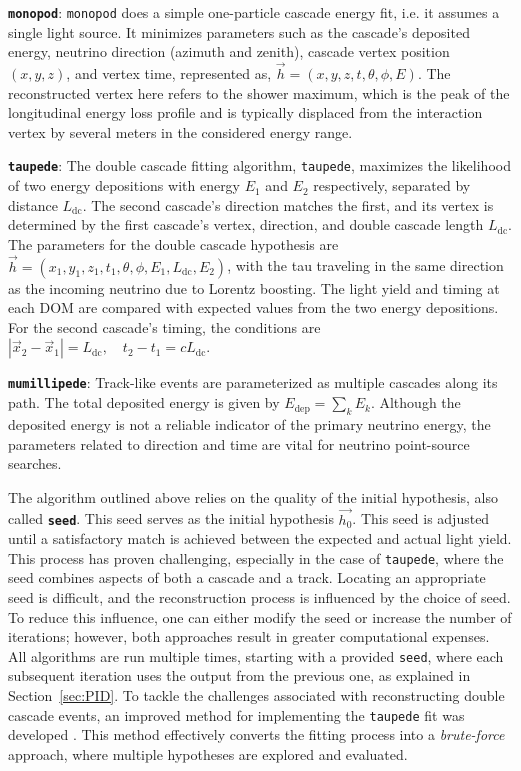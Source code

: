 \textbf{\texttt{monopod}}: \texttt{monopod} does a simple one-particle cascade energy fit, i.e. it assumes a single light source. It minimizes parameters such as the cascade's deposited energy, neutrino direction (azimuth and zenith), cascade vertex position $(x, y, z)$, and vertex time, represented as, $\vec{h} = (x, y, z, t, \theta, \phi, E)$. The reconstructed vertex here refers to the shower maximum, which is the peak of the longitudinal energy loss profile and is typically displaced from the interaction vertex by several meters in the considered energy range.

\textbf{\texttt{taupede}}: The double cascade fitting algorithm, \texttt{taupede}, maximizes the likelihood of two energy depositions with energy $E_1$ and $E_2$ respectively, separated by distance $L_{\mathrm{dc}}$. The second cascade's direction matches the first, and its vertex is determined by the first cascade's vertex, direction, and double cascade length $L_{\mathrm{dc}}$. The parameters for the double cascade hypothesis are $\vec{h} = (x_1, y_1, z_1, t_1, \theta, \phi, E_1, L_{\mathrm{dc}}, E_2)$, with the tau traveling in the same direction as the incoming neutrino due to Lorentz boosting. The light yield and timing at each DOM are compared with expected values from the two energy depositions. For the second cascade's timing, the conditions are $|\vec{x}_2 - \vec{x}_1| = L_{\text{dc}}, \quad t_2 - t_1 = c L_{\text{dc}}$. 

\textbf{\texttt{mumillipede}}: Track-like events are parameterized as multiple cascades along its path. The total deposited energy is given by $E_{\text{dep}} = \sum_k E_k$. Although the deposited energy is not a reliable indicator of the primary neutrino energy, the parameters related to direction and time are vital for neutrino point-source searches.

The algorithm outlined above relies on the quality of the initial hypothesis, also called \textbf{\texttt{seed}}. This seed serves as the initial hypothesis $\vec{h_0}$. This seed is adjusted until a satisfactory match is achieved between the expected and actual light yield. This process has proven challenging, especially in the case of \texttt{taupede}, where the seed combines aspects of both a cascade and a track. Locating an appropriate seed is difficult, and the reconstruction process is influenced by the choice of seed. To reduce this influence, one can either modify the seed or increase the number of iterations; however, both approaches result in greater computational expenses. All algorithms are run multiple times, starting with a provided \texttt{seed}, where each subsequent iteration uses the output from the previous one, as explained in Section~\ref{sec:PID}. To tackle the challenges associated with reconstructing double cascade events, an improved method for implementing the \texttt{taupede} fit was developed . This method effectively converts the fitting process into a \emph{brute-force} approach, where multiple hypotheses are explored and evaluated.  

